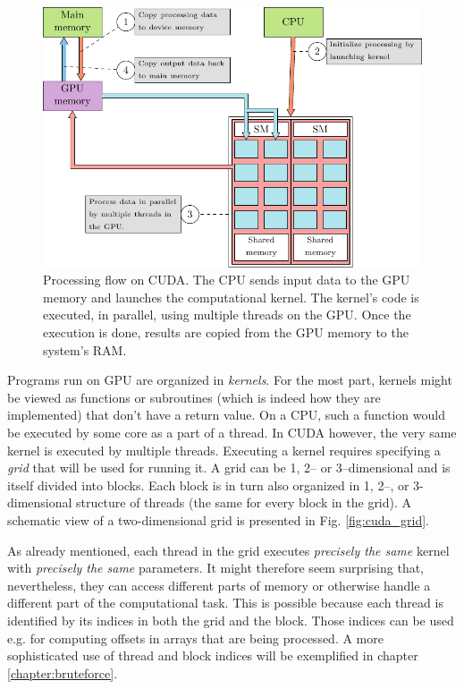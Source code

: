 \begin{figure}[ht]
  \centering
  \includegraphics[width=\textwidth]{figures/cuda_workflow}
  \caption{Processing flow on CUDA. The CPU sends input data to the GPU memory and
    launches the computational kernel. The kernel's code is executed, in parallel,
    using multiple threads on the GPU. Once the execution is done, results are
    copied from the GPU memory to the system's RAM.} \label{fig:cuda_flow}
\end{figure}

Programs run on GPU are organized in \emph{kernels}. For the most part, kernels
might be viewed as functions or subroutines (which is indeed how they are
implemented) that don't have a return value. On a CPU, such a function would be
executed by some core as a part of a thread. In CUDA however, the very same
kernel is executed by multiple threads. Executing a kernel requires specifying
a \emph{grid} that will be used for running it. A grid can be 1, 2-- or
3--dimensional and is itself divided into blocks. Each block is in turn also
organized in 1, 2--, or 3-dimensional structure of threads (the same for every
block in the grid). A schematic view of a two-dimensional grid is presented in
Fig. \ref{fig:cuda_grid}.

As already mentioned, each thread in the grid executes \emph{precisely the
  same} kernel with \emph{precisely the same} parameters. It might therefore seem
surprising that, nevertheless, they can access different parts of memory or
otherwise handle a different part of the computational task. This is possible
because each thread is identified by its indices in both the grid and the
block. Those indices can be used e.g. for computing offsets in arrays that are
being processed. A more sophisticated use of thread and block indices will be
exemplified in chapter \ref{chapter:bruteforce}.

